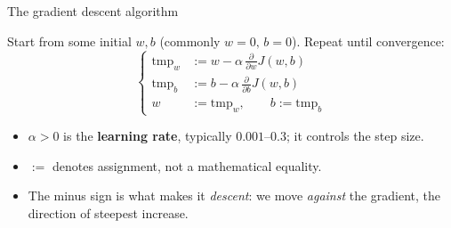 \documentclass[aspectratio=169,11pt]{beamer}
\begin{document}
\begin{frame}{The gradient descent algorithm}
  \begin{defnbox}
    Start from some initial $w,b$ (commonly $w=0,\,b=0$). Repeat until convergence:
    \[
      \left\{
      \begin{aligned}
        \text{tmp}_w &:= w - \alpha\,\frac{\partial}{\partial w}J(w,b)\\[2pt]
        \text{tmp}_b &:= b - \alpha\,\frac{\partial}{\partial b}J(w,b)\\[2pt]
        w &:= \text{tmp}_w,\qquad b := \text{tmp}_b
      \end{aligned}
      \right.
    \]
  \end{defnbox}
  \small
  \begin{itemize}
    \item $\alpha>0$ is the \textbf{learning rate}, typically $0.001$--$0.3$; it
          controls the step size.
    \item $:=$ denotes assignment, not a mathematical equality.
    \item The minus sign is what makes it \emph{descent}: we move \emph{against}
          the gradient, the direction of steepest increase.
  \end{itemize}
\end{frame}
\end{document}
